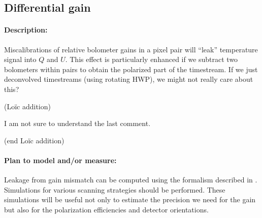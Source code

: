 \subsection{Differential gain}

\paragraph{Description:}
Miscalibrations of relative bolometer gains in a pixel pair will ``leak'' temperature signal into $Q$ and $U$.
This effect is particularly enhanced if we subtract two bolometers within pairs to obtain the polarized part of the timestream. If we just deconvolved timestreams (using rotating HWP), we might not really care about this?

(Loïc addition)

I am not sure to understand the last comment.

(end Loïc addition)


\paragraph{Plan to model and/or measure:}
Leakage from gain mismatch can be computed using the formalism described in \cite{rosset2010}. Simulations for various scanning strategies should be performed. These simulations will be useful not only to estimate the precision we need for the gain but also for the polarization efficiencies and detector orientations.

%
